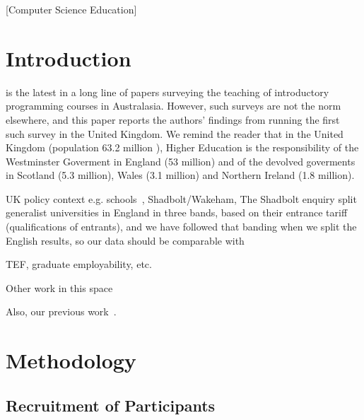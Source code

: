 \documentclass{sig-alternate}
\begin{document}
[Computer Science Education]

\section{Introduction}\label{intro}

\cite{mason+cooper:2014} is the latest in a long line \cite{deraadt-et-al:2004,mason-et-al:2012} of papers surveying the teaching of introductory programming courses in Australasia. However, such surveys are not the norm elsewhere, and this paper reports the authors' findings from running the first such survey in the United Kingdom. We remind the reader that in the United Kingdom (population 63.2 million \cite{Census}), Higher Education is the responsibility of the Westminster Goverment in England (53 million) and of the devolved goverments in Scotland (5.3 million), Wales (3.1 million) and Northern Ireland (1.8 million).

UK policy context
e.g. schools~\cite{brown-et-al-sigcse2013,brown-et-al-toce2014},
Shadbolt/Wakeham,
The Shadbolt enquiry split generalist universities in England in three bands, based on their entrance tariff (qualifications of entrants), and we have followed that banding when we split the English results, so our data should be comparable with \cite{shadbolt:2016}

 TEF, graduate employability, etc.

Other work in this
space~\cite{mccracken-et-al:2001,gupta:2004,dale:2006,pears-et-al:2007,guo:2014}

Also, our previous work~\cite{crick-et-al-hea:2015,davenport-et-al:latice2016}.


\section{Methodology}\label{method}

\subsection{Recruitment of Participants}
\end{document}
